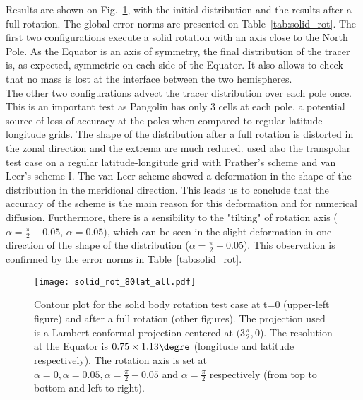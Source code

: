 Results are shown on Fig.~\ref{fig:solid_rot}, with the initial distribution and
the results after a full rotation. The global error norms are presented on
Table~\ref{tab:solid_rot}. The first two configurations execute a solid
rotation with an axis close to the North Pole. As the Equator is an axis of
symmetry, the final distribution of the tracer is, as expected, symmetric on
each side of the Equator. It also allows to check that no mass is lost at the
interface between the two hemispheres. \\
The other two configurations advect the tracer distribution over each pole once.
This is an important test as Pangolin has only 3 cells at each pole,
a potential source of loss of accuracy at the poles when compared to
regular latitude-longitude grids. The shape of the distribution after a full rotation
is distorted in the zonal direction and the extrema are much reduced.
\cite{Hourdin2005} used also the transpolar test case on a regular
latitude-longitude grid with Prather's scheme and van Leer's scheme I. The van
Leer scheme showed a deformation in the shape of the distribution in the
meridional direction. This leads us to conclude that the accuracy of the scheme
is the main reason for this deformation and for numerical diffusion.
Furthermore, there is a sensibility to the "tilting" of rotation axis
($\alpha=\frac{\pi}{2}-0.05$, $\alpha=0.05$), which can be seen in the slight
deformation in one direction of the shape of the distribution
($\alpha=\frac{\pi}{2}-0.05$). This observation is confirmed by the error norms
in Table~\ref{tab:solid_rot}.

\begin{figure}
  \centering
  \texttt{[image: solid\_rot\_80lat\_all.pdf]}
  \caption{Contour plot for the solid body rotation test case at t=0 (upper-left
    figure) and after a full rotation (other figures). The projection used is a
    Lambert conformal projection centered at $(3\frac{\pi}{2}, 0$). The
    resolution at the Equator is $0.75\times1.13\degre$ (longitude and latitude
    respectively). The rotation axis is set at $\alpha=0, \alpha=0.05,
    \alpha=\frac{\pi}{2}-0.05$ and $\alpha=\frac{\pi}{2}$ respectively (from top
    to bottom and left to right).}
  \label{fig:solid_rot}
\end{figure}

